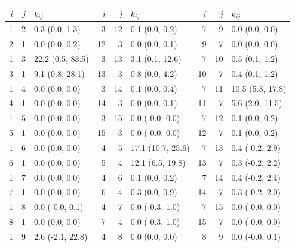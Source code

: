\begin{table}
    \centering
    \label{tab:base_case_rate_matrix}
    \begin{tabular}{|rrl||rrl||rrl|}
    \hline
     $i$ &  $j$ &          $k_{ij}$ &  $i$ &  $j$ &           $k_{ij}$ &  $i$ &  $j$ &            $k_{ij}$ \\
    \hline\hline
       1 &    2 &    0.3 (0.0, 1.3) &    3 &   12 &     0.1 (0.0, 0.2) &    7 &    9 &      0.0 (0.0, 0.0) \\
       2 &    1 &    0.0 (0.0, 0.2) &   12 &    3 &     0.0 (0.0, 0.1) &    9 &    7 &      0.0 (0.0, 0.0) \\
       1 &    3 &  22.2 (0.5, 83.5) &    3 &   13 &    3.1 (0.1, 12.6) &    7 &   10 &      0.5 (0.1, 1.2) \\
       3 &    1 &   9.1 (0.8, 28.1) &   13 &    3 &     0.8 (0.0, 4.2) &   10 &    7 &      0.4 (0.1, 1.2) \\
       1 &    4 &    0.0 (0.0, 0.0) &    3 &   14 &     0.1 (0.0, 0.4) &    7 &   11 &    10.5 (5.3, 17.8) \\
       4 &    1 &    0.0 (0.0, 0.0) &   14 &    3 &     0.0 (0.0, 0.1) &   11 &    7 &     5.6 (2.0, 11.5) \\
       1 &    5 &    0.0 (0.0, 0.0) &    3 &   15 &    0.0 (-0.0, 0.0) &    7 &   12 &      0.1 (0.0, 0.2) \\
       5 &    1 &    0.0 (0.0, 0.0) &   15 &    3 &    0.0 (-0.0, 0.0) &   12 &    7 &      0.1 (0.0, 0.2) \\
       1 &    6 &    0.0 (0.0, 0.0) &    4 &    5 &  17.1 (10.7, 25.6) &    7 &   13 &     0.4 (-0.2, 2.9) \\
       6 &    1 &    0.0 (0.0, 0.0) &    5 &    4 &   12.1 (6.5, 19.8) &   13 &    7 &     0.3 (-0.2, 2.2) \\
       1 &    7 &    0.0 (0.0, 0.0) &    4 &    6 &     0.1 (0.0, 0.2) &    7 &   14 &     0.4 (-0.2, 2.4) \\
       7 &    1 &    0.0 (0.0, 0.0) &    6 &    4 &     0.3 (0.0, 0.9) &   14 &    7 &     0.3 (-0.2, 2.0) \\
       1 &    8 &   0.0 (-0.0, 0.1) &    4 &    7 &    0.0 (-0.3, 1.0) &    7 &   15 &     0.0 (-0.0, 0.0) \\
       8 &    1 &    0.0 (0.0, 0.0) &    7 &    4 &    0.0 (-0.3, 1.0) &   15 &    7 &     0.0 (-0.0, 0.0) \\
       1 &    9 &  2.6 (-2.1, 22.8) &    4 &    8 &     0.0 (0.0, 0.0) &    8 &    9 &     0.0 (-0.0, 0.1) \\

\end{tabular}
\end{table}
